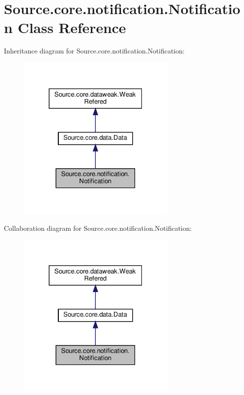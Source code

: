 \hypertarget{classSource_1_1core_1_1notification_1_1Notification}{}\section{Source.\+core.\+notification.\+Notification Class Reference}
\label{classSource_1_1core_1_1notification_1_1Notification}


Inheritance diagram for Source.\+core.\+notification.\+Notification\+:\nopagebreak
\begin{figure}[H]
\begin{center}
\leavevmode
\includegraphics[width=223pt]{classSource_1_1core_1_1notification_1_1Notification__inherit__graph}
\end{center}
\end{figure}


Collaboration diagram for Source.\+core.\+notification.\+Notification\+:\nopagebreak
\begin{figure}[H]
\begin{center}
\leavevmode
\includegraphics[width=223pt]{classSource_1_1core_1_1notification_1_1Notification__coll__graph}
\end{center}
\end{figure}
